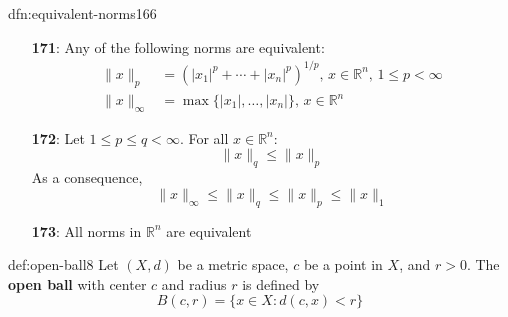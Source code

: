 \documentclass[landscape, 8pt]{extarticle}
\begin{document}
\begin{multicols}{3}
\begin{dfn}{dfn:equivalent-norms}{166}
    \vspace{-10pt}
    \begin{itemize}
        \item[\textbf{171}:] Any of the following norms are equivalent:
            \begin{align*}
                \lVert x \rVert_{p} &= (\lvert x_{1} \rvert^{p} + \cdots + \lvert x_{n} \rvert^{p})^{1 /p},\,x\in \mathbb{R}^{n},\, 1\le p < \infty\\
                \lVert x \rVert_{\infty} &= \max \{\lvert x_{1} \rvert,\dots,\lvert x_{n} \rvert\},\,x\in\mathbb{R}^{n}
            \end{align*}
        \item[\textbf{172}:] Let $1 \le p \le q < \infty$. For all $x\in\mathbb{R}^{n}$:
            \[\lVert x \rVert_{q} \le \lVert x \rVert_{p}\]
            As a consequence,
            \[\lVert x \rVert_{\infty} \le \lVert x \rVert_{q} \le \lVert x \rVert_{p} \le \lVert x \rVert_{1}\]
        \item[\textbf{173}:] All norms in $\mathbb{R}^{n}$ are equivalent

    \end{itemize}
\end{dfn}

\setcounter{subsection}{1}

\begin{dfn}{def:open-ball}{8}
    Let $(X, d)$ be a metric space, $c$ be a point in $X$, and $r > 0$. The \textbf{open ball} with center $c$ and radius $r$ is defined by
    \[B(c,r) = \{x\in X: d(c,x) < r\}\]
\end{dfn}


%
%
%
%


\end{multicols}
\end{document}
